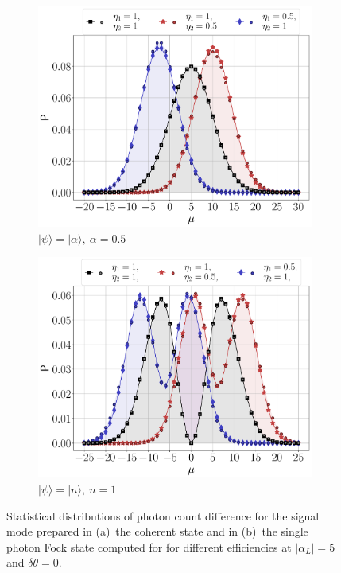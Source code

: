 \documentclass[%
reprint,
superscriptaddress,
 amsmath,amssymb,amsfonts,
 aps,
 pra,
 longbibliography
]{revtex4-2}
\newcommand{\ket}[1]{\ensuremath{|{#1}\rangle}}
\begin{document}
\begin{figure}
    \centering
    \begin{subfigure}[]{.45\textwidth}
\includegraphics[width=\linewidth]{pics/homodyne/coherent_distributions.pdf}
\caption[]{$\ket{\psi}=\ket{\alpha},\:$$\alpha=0.5$}
\label{fig:dist_alp}
        \end{subfigure}
        \begin{subfigure}[]{.45\textwidth}
 \includegraphics[width=\linewidth]{pics/homodyne/fock_distributions.pdf}
\caption[]{$\ket{\psi}=\ket{n},\:n=1$}
\label{fig:dist_fock}
\end{subfigure}
\caption{Statistical distributions of photon count difference
  for the signal mode prepared in (a)~the coherent state and
  in (b)~the single photon Fock state computed for
  for different efficiencies  at $|\alpha_L|=5$
  and $\delta\theta=0$.
}
\label{fig:dist-hom}
\end{figure}
\end{document}
